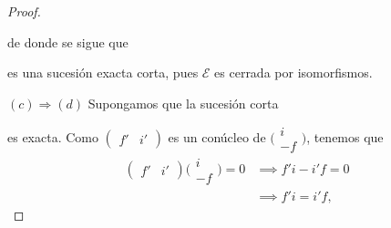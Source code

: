 \documentclass[tesis]{subfiles}
\begin{document}
\begin{proof}
\begin{center}
\begin{tikzcd}
        \end{tikzcd}
    \end{center}
    de donde se sigue que  es una sucesión exacta corta, pues $\mathscr{E}$ es cerrada por isomorfismos.


        $(c)\Rightarrow(d)$ Supongamos que la sucesión corta  es exacta. Como $(\begin{smallmatrix} f' &i' \end{smallmatrix})$ es un conúcleo de $\big(\begin{smallmatrix} i \\ -f \end{smallmatrix}\big)$, tenemos que
    \begin{align*}
        (\begin{smallmatrix} f' &i' \end{smallmatrix})\big(\begin{smallmatrix} i \\ -f \end{smallmatrix}\big) = 0 &\implies f'i - i'f = 0 \\
                                &\implies f'i = i'f,
    \end{align*}

\end{proof}
\end{document}

